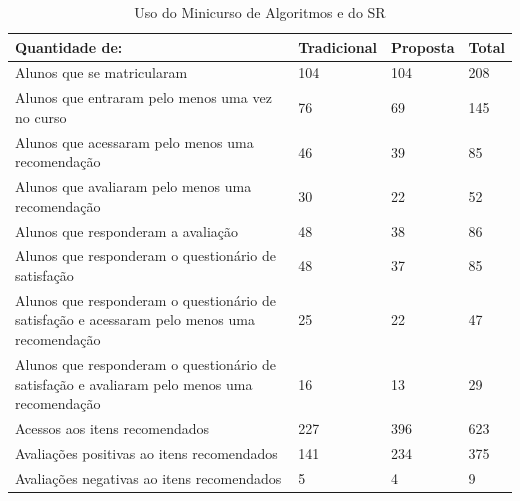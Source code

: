 \begin{table}[h]
\centering
\caption{Uso do Minicurso de Algoritmos e do SR}
\label{tab:uso-minicurso-sr}
\begin{tabular}{|p{7.5cm}|p{2.5cm}|p{2.5cm}|p{2.5cm}|}
\hline
\textbf{Quantidade de:}                                                                     & \textbf{Tradicional} & \textbf{Proposta}    & \textbf{Total}    \\
\hline
Alunos que se matricularam                                                                  & 104                  & 104                  & 208      \\
\hline
Alunos que entraram pelo menos uma vez no curso                                             & 76                   & 69                   & 145      \\
\hline
Alunos que acessaram pelo menos uma recomendação                                            & 46                   & 39                   & 85       \\
\hline
Alunos que avaliaram pelo menos uma recomendação                                            & 30                   & 22                   & 52       \\
\hline
Alunos que responderam a avaliação                                                          & 48                   & 38                   & 86       \\
\hline
Alunos que responderam o questionário de satisfação                                         & 48                   & 37                   & 85       \\
\hline
Alunos que responderam o questionário de satisfação e acessaram pelo menos uma recomendação & 25                   & 22                   & 47       \\
\hline
Alunos que responderam o questionário de satisfação e avaliaram pelo menos uma recomendação & 16                   & 13                   & 29       \\
\hline
Acessos aos itens recomendados                                                              & 227                  & 396                  & 623      \\
\hline
Avaliações positivas ao itens recomendados                                                  & 141                  & 234                  & 375      \\
\hline
Avaliações negativas ao itens recomendados                                                  & 5                    & 4                    & 9        \\
\hline
\end{tabular}
\end{table}

